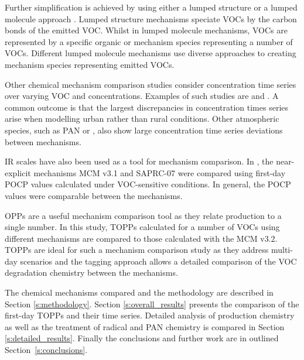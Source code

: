 Further simplification is achieved by using either a lumped structure or a lumped molecule approach \citep{Dodge:2000}. 
Lumped structure mechanisms speciate VOCs by the carbon bonds of the emitted VOC. 
Whilst in lumped molecule mechanisms, VOCs are represented by a specific organic or mechanism species representing a number of VOCs. 
Different lumped molecule mechanisms use diverse approaches to creating mechanism species representing emitted VOCs.  

Other chemical mechanism comparison studies consider  concentration time series over varying VOC and  concentrations. 
Examples of such studies are \citet{Dunker:1984, Kuhn:1998, Gross:2003} and \citet{Emmerson:2009}. 
A common outcome is that the largest discrepancies in  concentration times series arise when modelling urban rather than rural conditions. 
Other atmospheric species, such as PAN or , also show large concentration time series deviations between mechanisms.

IR scales have also been used as a tool for mechanism comparison. 
In \citet{Derwent:2010}, the near-explicit mechanisms MCM v3.1 and SAPRC-07 were compared using first-day POCP values calculated under VOC-sensitive conditions. 
In general, the POCP values were comparable between the mechanisms. 

OPPs are a useful mechanism comparison tool as they relate  production to a single number. 
In this study, TOPPs calculated for a number of VOCs using different mechanisms are compared to those calculated with the MCM v3.2. 
TOPPs are ideal for such a mechanism comparison study as they address multi-day scenarios and the tagging approach allows a detailed comparison of the VOC degradation chemistry between the mechanisms.

The chemical mechanisms compared and the methodology are described in Section \ref{s:methodology}. 
Section \ref{s:overall_results} presents the comparison of the first-day TOPPs and their time series. 
Detailed analysis of  production chemistry as well as the treatment of radical and PAN chemistry is compared in Section \ref{s:detailed_results}. 
Finally the conclusions and further work are in outlined \mbox{Section \ref{s:conclusions}}.  
